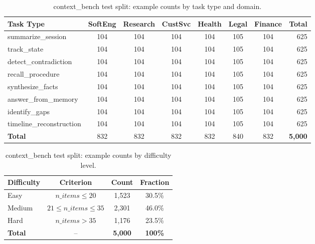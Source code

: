 \begin{table}[h!]
\centering
\caption{context\_bench test split: example counts by task type and domain.}
\label{tab:app_task_domain_dist}
\small
\setlength{\tabcolsep}{4pt}
\begin{tabular}{@{}lccccccr@{}}
\toprule
\textbf{Task Type} & \textbf{SoftEng} & \textbf{Research} & \textbf{CustSvc} & \textbf{Health} & \textbf{Legal} & \textbf{Finance} & \textbf{Total} \\
\midrule
summarize\_session         & 104 & 104 & 104 & 104 & 105 & 104 & 625 \\
track\_state               & 104 & 104 & 104 & 104 & 105 & 104 & 625 \\
detect\_contradiction      & 104 & 104 & 104 & 104 & 105 & 104 & 625 \\
recall\_procedure          & 104 & 104 & 104 & 104 & 105 & 104 & 625 \\
synthesize\_facts          & 104 & 104 & 104 & 104 & 105 & 104 & 625 \\
answer\_from\_memory       & 104 & 104 & 104 & 104 & 105 & 104 & 625 \\
identify\_gaps             & 104 & 104 & 104 & 104 & 105 & 104 & 625 \\
timeline\_reconstruction   & 104 & 104 & 104 & 104 & 105 & 104 & 625 \\
\midrule
\textbf{Total}             & 832 & 832 & 832 & 832 & 840 & 832 & \textbf{5{,}000} \\
\bottomrule
\end{tabular}
\end{table}

\begin{table}[h!]
\centering
\caption{context\_bench test split: example counts by difficulty level.}
\label{tab:app_difficulty_dist}
\begin{tabular}{@{}lccc@{}}
\toprule
\textbf{Difficulty} & \textbf{Criterion} & \textbf{Count} & \textbf{Fraction} \\
\midrule
Easy   & $n\_items \leq 20$  & 1{,}523 & 30.5\% \\
Medium & $21 \leq n\_items \leq 35$ & 2{,}301 & 46.0\% \\
Hard   & $n\_items > 35$     & 1{,}176 & 23.5\% \\
\midrule
\textbf{Total} & -- & \textbf{5{,}000} & \textbf{100\%} \\
\bottomrule
\end{tabular}
\end{table}

